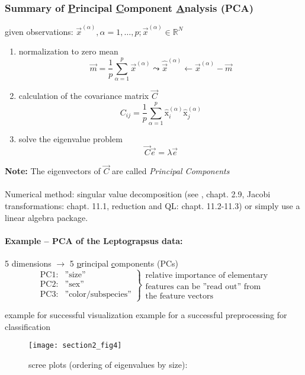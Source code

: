 
\subsubsection{Summary of \underline{P}rincipal \underline{C}omponent
		\underline{A}nalysis (PCA)}
given observations: $\vec{x}^{(\alpha)}, \alpha = 1, \ldots, p; \vec{x}^{(\alpha)} \in \mathbb{R}^N$

\begin{enumerate}[(1)]
\item normalization to zero mean
\begin{equation}
	\vec{m} = \frac{1}{p} \sum\limits_{\alpha = 1}^p \vec{x}^{(\alpha)}
		\leadsto \widehat{\vec{x}}^{(\alpha)} 
		\leftarrow \vec{x}^{(\alpha)} - \vec{m}
\end{equation}
\item calculation of the covariance matrix $\vec{C}$
\begin{equation}
	C_{ij} = \frac{1}{p} \sum\limits_{\alpha = 1}^p 
		\widehat{\mathrm{x}}_i^{(\alpha)} 
		\widehat{\mathrm{x}}_j^{(\alpha)}
\end{equation}
\item solve the eigenvalue problem
\begin{equation}
	\vec{C} \vec{e} = \lambda \vec{e}
\end{equation}
\end{enumerate}
\textbf{Note:} The eigenvectors of $\vec{C}$ are called \emph{Principal Components}
\\\\
Numerical method: singular value decomposition (see \cite{PressEtAl2007}, chapt. 2.9, Jacobi transformations: chapt. 11.1, reduction and QL: chapt. 11.2-11.3) or simply use a linear algebra package.


\paragraph{Example -- PCA of the Leptograpsus data:} 
5 dimensions $\rightarrow$ 5 \underline{p}rincipal \underline{c}omponents (PCs)
\[ \left. \begin{array}{ll}
	\text{PC1:} & \text{''size''} \\
	\text{PC2:} & \text{''sex''} \\
	\text{PC3:} & \text{''color/subspecies''}
\end{array} \right\} \substack{ \text{relative importance of elementary} \\
				\text{features can be ''read out'' from} \\
				\text{the feature vectors} }
\]
\begin{itemize}
	\itR example for successful visualization
	\itR example for a successful preprocessing for classification
\end{itemize}
\begin{figure}[h]
  \centering
\texttt{[image: section2\_fig4]}  
  \caption{scree plots (ordering of eigenvalues by size):}
  \label{fig:screePlot}
\end{figure}

